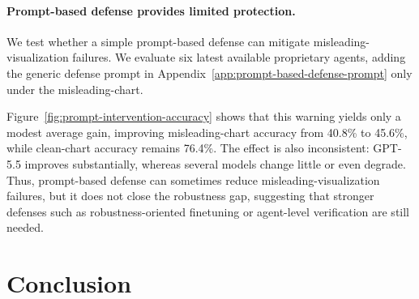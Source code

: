 \documentclass[11pt]{article}
\begin{document}
\paragraph{Prompt-based defense provides limited protection.}
We test whether a simple prompt-based defense can mitigate misleading-visualization failures. We evaluate six latest available proprietary agents, adding the generic defense prompt in Appendix~\ref{app:prompt-based-defense-prompt} only under the misleading-chart. 

Figure~\ref{fig:prompt-intervention-accuracy} shows that this warning yields only a modest average gain, improving misleading-chart accuracy from 40.8\% to 45.6\%, while clean-chart accuracy remains 76.4\%. The effect is also inconsistent: GPT-5.5 improves substantially, whereas several models change little or even degrade. Thus, prompt-based defense can sometimes reduce misleading-visualization failures, but it does not close the robustness gap, suggesting that stronger defenses such as robustness-oriented finetuning or agent-level verification are still needed.

\section{Conclusion}
\end{document}
